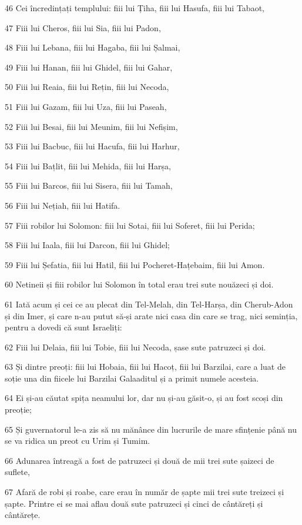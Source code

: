 \par 46 Cei încredințați templului: fiii lui Țiha, fiii lui Hasufa, fiii lui Tabaot,
\par 47 Fiii lui Cheros, fiii lui Sia, fiii lui Padon,
\par 48 Fiii lui Lebana, fiii lui Hagaba, fiii lui Șalmai,
\par 49 Fiii lui Hanan, fiii lui Ghidel, fiii lui Gahar,
\par 50 Fiii lui Reaia, fiii lui Rețin, fiii lui Necoda,
\par 51 Fiii lui Gazam, fiii lui Uza, fiii lui Paseah,
\par 52 Fiii lui Besai, fiii lui Meunim, fiii lui Nefișim,
\par 53 Fiii lui Bacbuc, fiii lui Hacufa, fiii lui Harhur,
\par 54 Fiii lui Bațlit, fiii lui Mehida, fiii lui Harșa,
\par 55 Fiii lui Barcos, fiii lui Sisera, fiii lui Tamah,
\par 56 Fiii lui Nețiah, fiii lui Hatifa.
\par 57 Fiii robilor lui Solomon: fiii lui Sotai, fiii lui Soferet, fiii lui Perida;
\par 58 Fiii lui Iaala, fiii lui Darcon, fiii lui Ghidel;
\par 59 Fiii lui Șefatia, fiii lui Hatil, fiii lui Pocheret-Hațebaim, fiii lui Amon.
\par 60 Netineii și fiii robilor lui Solomon în total erau trei sute nouăzeci și doi.
\par 61 Iată acum și cei ce au plecat din Tel-Melah, din Tel-Harșa, din Cherub-Adon și din Imer, și care n-au putut să-și arate nici casa din care se trag, nici seminția, pentru a dovedi că sunt Israeliți:
\par 62 Fiii lui Delaia, fiii lui Tobie, fiii lui Necoda, șase sute patruzeci și doi.
\par 63 Și dintre preoți: fiii lui Hobaia, fiii lui Hacoț, fiii lui Barzilai, care a luat de soție una din fiicele lui Barzilai Galaaditul și a primit numele acesteia.
\par 64 Ei și-au căutat spița neamului lor, dar nu și-au găsit-o, și au fost scoși din preoție;
\par 65 Și guvernatorul le-a zis să nu mănânce din lucrurile de mare sfințenie până nu se va ridica un preot cu Urim și Tumim.
\par 66 Adunarea întreagă a fost de patruzeci și două de mii trei sute șaizeci de suflete,
\par 67 Afară de robi și roabe, care erau în număr de șapte mii trei sute treizeci și șapte. Printre ei se mai aflau două sute patruzeci și cinci de cântăreți și cântărețe.
